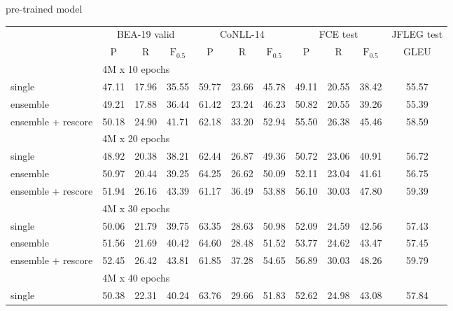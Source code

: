\documentclass[11pt]{article}
\begin{document}
\begin{multicols}{2}
	\begin{table}[H]
		\centering
		\tiny
		\tabcolsep 1.2pt
		pre-trained model \\
		\begin{tabular}{@{\extracolsep{2.5pt}}l ccc|ccc|ccc|c@{}}
			\hline
			& \multicolumn{3}{c}{BEA-19 valid}
			& \multicolumn{3}{c}{CoNLL-14}
			& \multicolumn{3}{c}{FCE test}
			& \multicolumn{1}{c}{\hspace{-2em}JFLEG test\hspace{-2em}}
			\\ \cline{2-4} \cline{5-7} \cline{8-10} \cline{11-11}
			& P & R & $\textrm{F}_{0.5}$
			& P & R & $\textrm{F}_{0.5}$
			& P & R & $\textrm{F}_{0.5}$
			& GLEU \\
			\hline
			& \multicolumn{10}{l}{4M x 10 epochs} \\
			single
			& 47.11 & 17.96 & 35.55 & 59.77 & 23.66 & 45.78 & 49.11 & 20.55 & 38.42 & 55.57 \\
			ensemble
			& 49.21 & 17.88 & 36.44 & 61.42 & 23.24 & 46.23 & 50.82 & 20.55 & 39.26 & 55.39 \\
			ensemble + rescore
			& 50.18 & 24.90 & 41.71 & 62.18 & 33.20 & 52.94 & 55.50 & 26.38 & 45.46 & 58.59 \\
			\hline
			& \multicolumn{10}{l}{4M x 20 epochs} \\
			single
			& 48.92 & 20.38 & 38.21 & 62.44 & 26.87 & 49.36 & 50.72 & 23.06 & 40.91 & 56.72 \\
			ensemble
			& 50.97 & 20.44 & 39.25 & 64.25 & 26.62 & 50.09 & 52.11 & 23.04 & 41.61 & 56.75 \\
			ensemble + rescore
			& 51.94 & 26.16 & 43.39 & 61.17 & 36.49 & 53.88 & 56.10 & 30.03 & 47.80 & 59.39 \\
			\hline
			& \multicolumn{10}{l}{4M x 30 epochs} \\
			single
			& 50.06 & 21.79 & 39.75 & 63.35 & 28.63 & 50.98 & 52.09 & 24.59 & 42.56 & 57.43 \\
			ensemble
			& 51.56 & 21.69 & 40.42 & 64.60 & 28.48 & 51.52 & 53.77 & 24.62 & 43.47 & 57.45 \\
			ensemble + rescore
			& 52.45 & 26.42 & 43.81 & 61.85 & 37.28 & 54.65 & 56.89 & 30.03 & 48.26 & 59.79 \\
			\hline
			& \multicolumn{10}{l}{4M x 40 epochs} \\
			single
			& 50.38 & 22.31 & 40.24 & 63.76 & 29.66 & 51.83 & 52.62 & 24.98 & 43.08 & 57.84 \\

\end{tabular}
\end{table}
\end{multicols}
\end{document}
